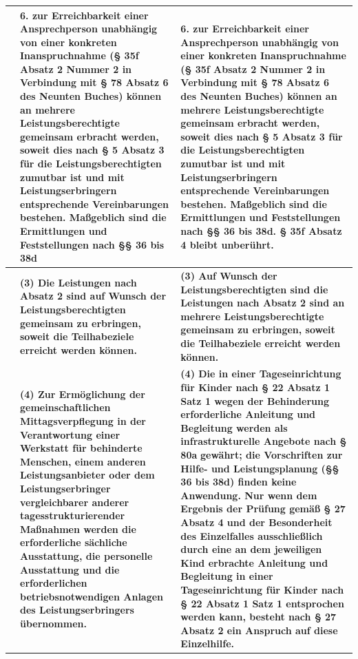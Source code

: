\documentclass[10pt,a4paper,landscape]{article}
\begin{document}
\begin{longtable}{|L{8.6cm}|L{8.6cm}|L{8.6cm}|}
 & \textbf{6. zur Erreichbarkeit einer Ansprechperson unabhängig von einer konkreten Inanspruchnahme (\S{} 35f Absatz 2 Nummer 2 in Verbindung mit \S{} 78 Absatz 6 des Neunten Buches) können an mehrere Leistungsberechtigte gemeinsam erbracht werden, soweit dies nach \S{} 5 Absatz 3 für die Leistungsberechtigten zumutbar ist und mit Leistungserbringern entsprechende Vereinbarungen bestehen. Maßgeblich sind die Ermittlungen und Feststellungen nach \S{}\S{} 36 bis 38d } & \textbf{6. zur Erreichbarkeit einer Ansprechperson unabhängig von einer konkreten Inanspruchnahme (\S{} 35f Absatz 2 Nummer 2 in Verbindung mit \S{} 78 Absatz 6 des Neunten Buches) können an mehrere Leistungsberechtigte gemeinsam erbracht werden, soweit dies nach \S{} 5 Absatz 3 für die Leistungsberechtigten zumutbar ist und mit Leistungserbringern entsprechende Vereinbarungen bestehen. Maßgeblich sind die Ermittlungen und Feststellungen nach \S{}\S{} 36 bis 38d. \S{} 35f Absatz 4 bleibt unberührt. } \\
\hline
 & \textbf{(3) Die Leistungen nach Absatz 2 sind auf Wunsch der Leistungsberechtigten gemeinsam zu erbringen, soweit die Teilhabeziele erreicht werden können. } & \textbf{(3) Auf Wunsch der Leistungsberechtigten sind die Leistungen nach Absatz 2 sind an mehrere Leistungsberechtigte gemeinsam zu erbringen, soweit die Teilhabeziele erreicht werden können. } \\
\hline
 & \textbf{(4) Zur Ermöglichung der gemeinschaftlichen Mittagsverpflegung in der Verantwortung einer Werkstatt für behinderte Menschen, einem anderen Leistungsanbieter oder dem Leistungserbringer vergleichbarer anderer tagesstrukturierender Maßnahmen werden die erforderliche sächliche Ausstattung, die personelle Ausstattung und die erforderlichen betriebsnotwendigen Anlagen des Leistungserbringers übernommen. } & \textbf{(4) Die in einer Tageseinrichtung für Kinder nach \S{} 22 Absatz 1 Satz 1 wegen der Behinderung erforderliche Anleitung und Begleitung werden als infrastrukturelle Angebote nach \S{} 80a }\textbf{gewährt; die Vorschriften zur Hilfe- und Leistungsplanung (\S{}\S{} 36 bis 38d) finden keine Anwendung. Nur wenn dem Ergebnis der Prüfung gemäß \S{} 27 Absatz 4 und der Besonderheit des Einzelfalles ausschließlich durch eine an dem jeweiligen Kind erbrachte Anleitung und Begleitung in einer Tageseinrichtung für Kinder nach \S{} 22 Absatz 1 Satz 1 entsprochen werden kann, besteht nach \S{} 27 Absatz 2 ein Anspruch auf diese Einzelhilfe. } \\
\hline

\end{longtable}
\end{document}
